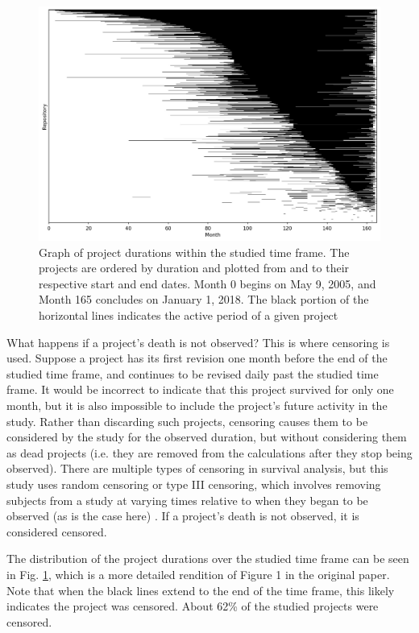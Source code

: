 \documentclass[acmconf]{acmart}
\begin{document}
\begin{figure}[!ht]
\centering
\includegraphics[scale=0.4]{figure1.jpg}
\caption{
    Graph of project durations within the studied time frame.
    The projects are ordered by duration and plotted from and to their respective start and end dates.
    Month 0 begins on May 9, 2005, and Month 165 concludes on January 1, 2018.
    The black portion of the horizontal lines indicates the active period of a given project
    }
\label{fig:figure-1}
\end{figure}

What happens if a project's death is not observed?
This is where censoring is used.
Suppose a project has its first revision one month before the end of the studied time frame, and continues to be revised daily past the studied time frame.
It would be incorrect to indicate that this project survived for only one month, but it is also impossible to include the project's future activity in the study.
Rather than discarding such projects, censoring causes them to be considered by the study for the observed duration, but without considering them as dead projects (i.e. they are removed from the calculations after they stop being observed).
There are multiple types of censoring in survival analysis, but this study uses random censoring or type III censoring, which involves removing subjects from a study at varying times relative to when they began to be observed (as is the case here) \cite{renganathan2016overview}. If a project's death is not observed, it is considered censored.

The distribution of the project durations over the studied time frame can be seen in Fig. \ref{fig:figure-1}, which is a more detailed rendition of Figure 1 in the original paper.
Note that when the black lines extend to the end of the time frame, this likely indicates the project was censored.
About 62\% of the studied projects were censored.
\end{document}
